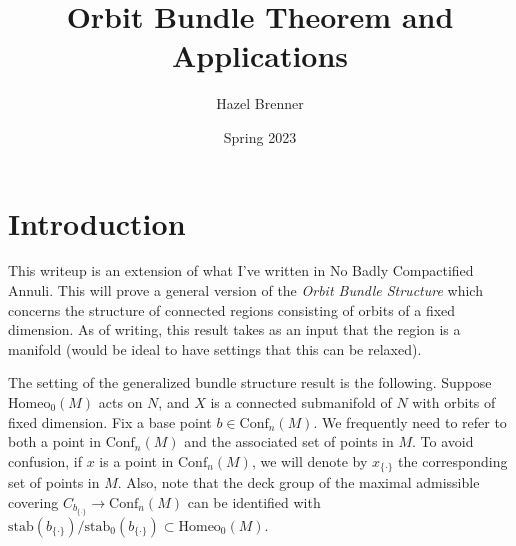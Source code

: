 \documentclass[10pt, oneside]{article}
\title{Orbit Bundle Theorem and Applications}
\author{Hazel Brenner}
\date{Spring 2023}
\newcommand{\homeo}[1][S^1]{\text{Homeo}_0(#1)}
\newcommand{\conf}[2][S^1]{\text{Conf}_{#2}(#1)}
\newcommand{\set}{{\{\cdot\}}}
\theoremstyle{definition}
\theoremstyle{definition}
\begin{document}
\maketitle

\section{Introduction}
This writeup is an extension 
of what I've written in No Badly Compactified Annuli.
This will prove a general version of the {\it Orbit Bundle Structure} 
which concerns the structure of connected regions consisting of orbits of a fixed dimension. 
As of writing, 
this result takes as an input that the region is a manifold 
(would be ideal to have settings that this can be relaxed). 

The setting of the generalized bundle structure result is the following.  
Suppose $\homeo[M]$ acts on $N$,
and $X$ is a connected submanifold of $N$ 
with orbits of fixed dimension. 
Fix a base point $b\in \conf[M]{n}$. 
We frequently need to refer to both a point in $\conf[M]{n}$
and the associated set of points in $M$.
To avoid confusion,
if $x$ is a point in $\conf[M]{n}$,
we will denote by $x_\set$ the corresponding set of points in $M$.
Also, 
note that the deck group of the maximal admissible covering $C_{b_\set} \to \conf[M]{n}$ can be identified with $\text{stab}(b_\set)/\text{stab}_0(b_\set)\subset\homeo[M]$.
\end{document}
